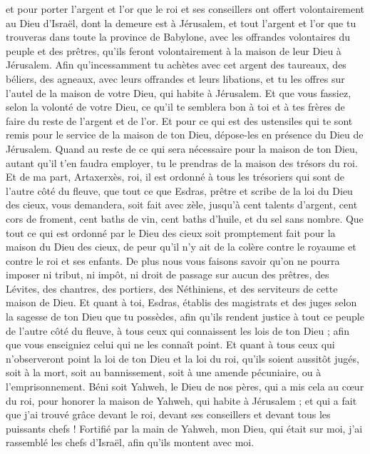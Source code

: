 \begin{multicols}{2}
et pour porter l'argent et l'or que le roi et ses conseillers ont offert volontairement au Dieu d'Israël, dont la demeure est à Jérusalem,
et tout l'argent et l'or que tu trouveras dans toute la province de Babylone, avec les offrandes volontaires du peuple et des prêtres, qu'ils feront volontairement à la maison de leur Dieu à Jérusalem.
Afin qu'incessamment tu achètes avec cet argent des taureaux, des béliers, des agneaux, avec leurs offrandes et leurs libations, et tu les offres sur l'autel de la maison de votre Dieu, qui habite à Jérusalem.
Et que vous fassiez, selon la volonté de votre Dieu, ce qu'il te semblera bon à toi et à tes frères de faire du reste de l'argent et de l'or.
Et pour ce qui est des ustensiles qui te sont remis pour le service de la maison de ton Dieu, dépose-les en présence du Dieu de Jérusalem.
Quand au reste de ce qui sera nécessaire pour la maison de ton Dieu, autant qu'il t'en faudra employer, tu le prendras de la maison des trésors du roi.
Et de ma part, Artaxerxès, roi, il est ordonné à tous les trésoriers qui sont de l'autre côté du fleuve, que tout ce que Esdras, prêtre et scribe de la loi du Dieu des cieux, vous demandera, soit fait avec zèle,
jusqu'à cent talents d'argent, cent cors de froment, cent baths de vin, cent baths d'huile, et du sel sans nombre.
Que tout ce qui est ordonné par le Dieu des cieux soit promptement fait pour la maison du Dieu des cieux, de peur qu'il n'y ait de la colère contre le royaume et contre le roi et ses enfants.
De plus nous vous faisons savoir qu'on ne pourra imposer ni tribut, ni impôt, ni droit de passage sur aucun des prêtres, des Lévites, des chantres, des portiers, des Néthiniens, et des serviteurs de cette maison de Dieu.
Et quant à toi, Esdras, établis des magistrats et des juges selon la sagesse de ton Dieu que tu possèdes, afin qu'ils rendent justice à tout ce peuple de l'autre côté du fleuve, à tous ceux qui connaissent les lois de ton Dieu ; afin que vous enseigniez celui qui ne les connaît point.
Et quant à tous ceux qui n'observeront point la loi de ton Dieu et la loi du roi, qu'ils soient aussitôt jugés, soit à la mort, soit au bannissement, soit à une amende pécuniaire, ou à l'emprisonnement.
Béni soit Yahweh, le Dieu de nos pères, qui a mis cela au cœur du roi, pour honorer la maison de Yahweh, qui habite à Jérusalem ;
et qui a fait que j'ai trouvé grâce devant le roi, devant ses conseillers et devant tous les puissants chefs ! Fortifié par la main de Yahweh, mon Dieu, qui était sur moi, j'ai rassemblé les chefs d'Israël, afin qu'ils montent avec moi.

\end{multicols}
